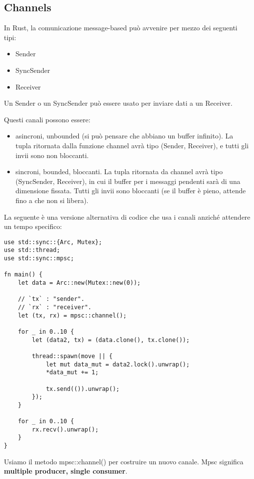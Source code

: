 \subsection{Channels}

In Rust, la comunicazione message-based può avvenire per mezzo dei seguenti tipi:

\begin{itemize}
  \item Sender
  \item SyncSender
  \item Receiver
\end{itemize}

Un Sender o un SyncSender può essere usato per inviare dati a un Receiver.

Questi canali possono essere:

\begin{itemize}
  \item asincroni, unbounded (si può pensare che abbiano un buffer infinito).
La tupla ritornata dalla funzione channel avrà tipo (Sender, Receiver), e
tutti gli invii sono non bloccanti.
  \item sincroni, bounded, bloccanti. La tupla ritornata da channel avrà tipo
(SyncSender, Receiver), in cui il buffer per i messaggi pendenti sarà di una
dimensione fissata. Tutti gli invii sono bloccanti (se il buffer è pieno,
attende fino a che non si libera).
\end{itemize}

La seguente è una versione alternativa di codice che usa i canali anziché
attendere un tempo specifico:

\begin{lstlisting}
use std::sync::{Arc, Mutex};
use std::thread;
use std::sync::mpsc;

fn main() {
    let data = Arc::new(Mutex::new(0));

    // `tx` : "sender".
    // `rx` : "receiver".
    let (tx, rx) = mpsc::channel();

    for _ in 0..10 {
        let (data2, tx) = (data.clone(), tx.clone());

        thread::spawn(move || {
            let mut data_mut = data2.lock().unwrap();
            *data_mut += 1;

            tx.send(()).unwrap();
        });
    }

    for _ in 0..10 {
        rx.recv().unwrap();
    }
}
\end{lstlisting}

Usiamo il metodo mpsc::channel() per costruire un nuovo canale.
Mpsc significa \textbf{multiple producer, single consumer}.

